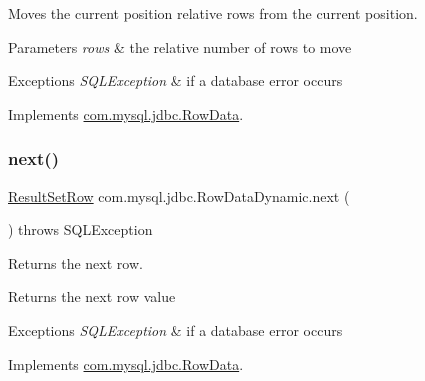 Moves the current position relative \textquotesingle{}rows\textquotesingle{} from the current position.


\begin{DoxyParams}{Parameters}
{\em rows} & the relative number of rows to move \\
\hline
\end{DoxyParams}

\begin{DoxyExceptions}{Exceptions}
{\em S\+Q\+L\+Exception} & if a database error occurs \\
\hline
\end{DoxyExceptions}


Implements \mbox{\hyperlink{interfacecom_1_1mysql_1_1jdbc_1_1_row_data_ad0ef1f79fa19fbd533c4e1bfbabd7316}{com.\+mysql.\+jdbc.\+Row\+Data}}.

\mbox{\label{classcom_1_1mysql_1_1jdbc_1_1_row_data_dynamic_af940fe3daed4a966db30feb64581dfe6}} 
\subsubsection{\texorpdfstring{next()}{next()}}
{\footnotesize\ttfamily \mbox{\hyperlink{classcom_1_1mysql_1_1jdbc_1_1_result_set_row}{Result\+Set\+Row}} com.\+mysql.\+jdbc.\+Row\+Data\+Dynamic.\+next (\begin{DoxyParamCaption}{ }\end{DoxyParamCaption}) throws S\+Q\+L\+Exception}

Returns the next row.

\begin{DoxyReturn}{Returns}
the next row value 
\end{DoxyReturn}

\begin{DoxyExceptions}{Exceptions}
{\em S\+Q\+L\+Exception} & if a database error occurs \\
\hline
\end{DoxyExceptions}


Implements \mbox{\hyperlink{interfacecom_1_1mysql_1_1jdbc_1_1_row_data_a1984eb77a7be765f3da79a1e2349af59}{com.\+mysql.\+jdbc.\+Row\+Data}}.

